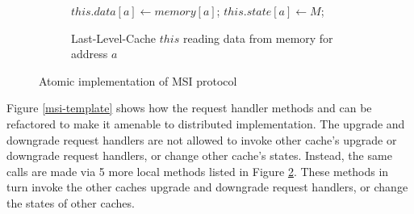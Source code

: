 \begin{figure}
\begin{subfigure}{\linewidth}
\begin{boxedminipage}{\linewidth}
\begin{algorithmic}
  \State $this.data[a] \gets memory[a]$;
  \State $this.state[a] \gets M$;
\EndProc
\end{algorithmic}
\end{boxedminipage}
\caption{Last-Level-Cache $this$ reading data from memory for address $a$}
\label{uResp}
\end{subfigure}

\caption{Atomic implementation of MSI protocol}
\label{atomic}
\end{figure}

Figure \ref{msi-template} shows how the request handler methods \uReq{} and
\dReq{} can be refactored to make it amenable to distributed implementation. The
upgrade and downgrade request handlers are not allowed to invoke other cache's
upgrade or downgrade request handlers, or change other cache's states. Instead,
the same calls are made via 5 more local methods listed in Figure \ref{atomic}.
These methods in turn invoke the other caches upgrade and downgrade request
handlers, or change the states of other caches.

